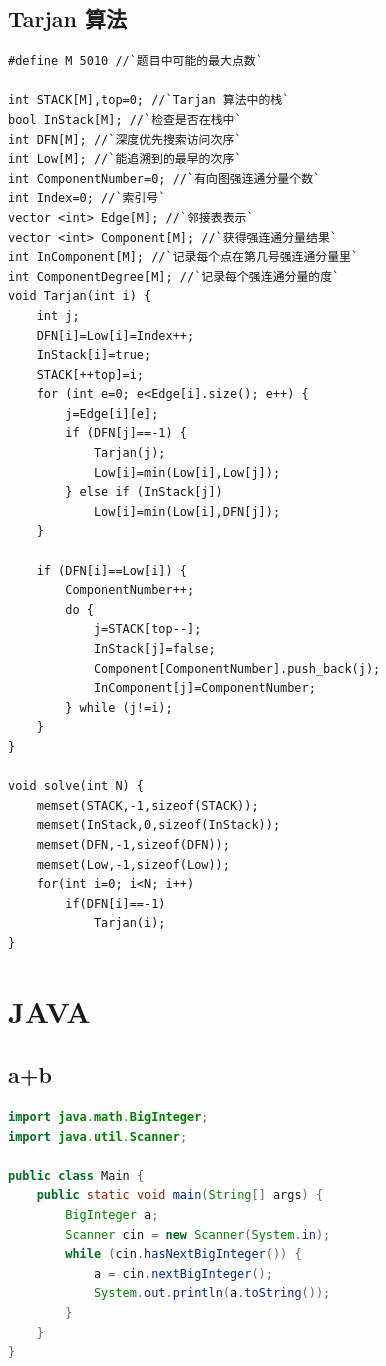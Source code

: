 \documentclass[a4paper]{article}
\begin{document}
\begin{CJK*}{UTF8}{gbsn}
\begin{multicols}{3}
\begin{flushleft}
\subsection{Tarjan 算法}
\begin{lstlisting}
#define M 5010 //`题目中可能的最大点数`

int STACK[M],top=0; //`Tarjan 算法中的栈`
bool InStack[M]; //`检查是否在栈中`
int DFN[M]; //`深度优先搜索访问次序`
int Low[M]; //`能追溯到的最早的次序`
int ComponentNumber=0; //`有向图强连通分量个数`
int Index=0; //`索引号`
vector <int> Edge[M]; //`邻接表表示`
vector <int> Component[M]; //`获得强连通分量结果`
int InComponent[M]; //`记录每个点在第几号强连通分量里`
int ComponentDegree[M]; //`记录每个强连通分量的度`
void Tarjan(int i) {
    int j;
    DFN[i]=Low[i]=Index++;
    InStack[i]=true;
    STACK[++top]=i;
    for (int e=0; e<Edge[i].size(); e++) {
        j=Edge[i][e];
        if (DFN[j]==-1) {
            Tarjan(j);
            Low[i]=min(Low[i],Low[j]);
        } else if (InStack[j])
            Low[i]=min(Low[i],DFN[j]);
    }

    if (DFN[i]==Low[i]) {
        ComponentNumber++;
        do {
            j=STACK[top--];
            InStack[j]=false;
            Component[ComponentNumber].push_back(j);
            InComponent[j]=ComponentNumber;
        } while (j!=i);
    }
}

void solve(int N) {
    memset(STACK,-1,sizeof(STACK));
    memset(InStack,0,sizeof(InStack));
    memset(DFN,-1,sizeof(DFN));
    memset(Low,-1,sizeof(Low));
    for(int i=0; i<N; i++)
        if(DFN[i]==-1)
            Tarjan(i);
}
\end{lstlisting}

\section{JAVA}
\subsection{a+b}
\begin{lstlisting}[language={Java}]
import java.math.BigInteger;
import java.util.Scanner;

public class Main {
    public static void main(String[] args) {
        BigInteger a;
        Scanner cin = new Scanner(System.in);
        while (cin.hasNextBigInteger()) {
            a = cin.nextBigInteger();
            System.out.println(a.toString());
        }
    }
}
\end{lstlisting}


\end{flushleft}
\end{multicols}
\end{CJK*}
\end{document}
